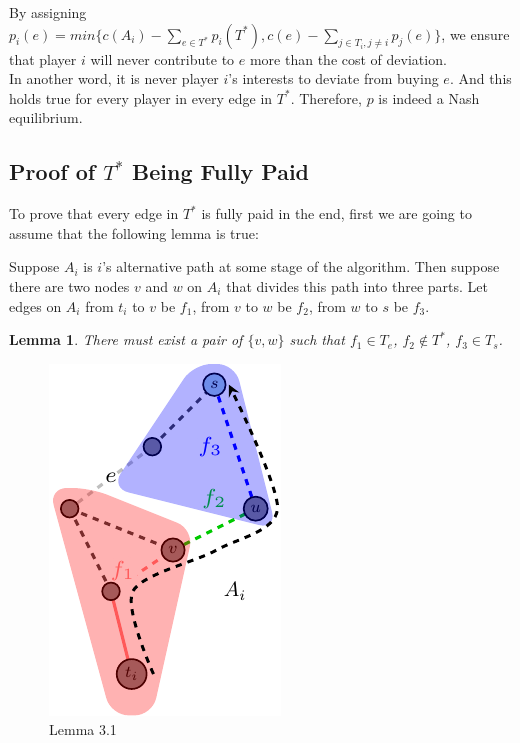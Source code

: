 \documentclass[11pt,psfig,times]{article}
\newtheorem{lemma}{Lemma}[section]
\begin{document}
By assigning $p_i(e) = min\{c(A_i) - \sum_{e\in T^*}p_i(T^*), c(e) - \sum_{j\in T_i,j\neq i}p_j(e)\}$, we ensure that player \(i\) will never contribute to \(e\) more than the cost of deviation. \\
In another word, it is never player $i$'s interests to deviate from buying $e$. And this holds true for every player in every edge in $T^*$. Therefore, \(p\) is indeed a Nash equilibrium. 

\subsection{Proof of $T^*$ Being Fully Paid}

To prove that every edge in \(T^*\) is fully paid in the end, first we are going to assume that the following lemma is true:

	Suppose \(A_i\) is \(i\)'s alternative path at some stage of the algorithm. Then suppose there are two nodes \(v\) and \(w\) on \(A_i\) that divides this path into three parts. Let edges on \(A_i\) from \(t_i\) to \(v\) be \(f_1\), from \(v\) to \(w\) be \(f_2\), from \(w\) to \(s\) be \(f_3\).
	\begin{lemma}
		There must exist a pair of \(\{v,w\}\) such that \(f_1 \in T_e\), \(f_2 \notin T^*\), \(f_3 \in T_s\).
	\end{lemma}


\begin{figure}[H]
\begin{center}
	\includegraphics{pictures/lemma3.1.pdf}
	\end{center}
	\caption{Lemma 3.1}
	\label{fig:lemma3.1}
\end{figure}
	
\end{document}
